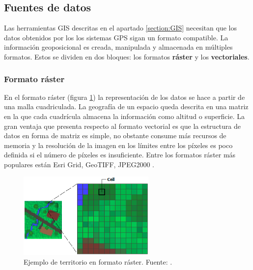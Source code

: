 \subsection{Fuentes de datos}
Las herramientas \ac{GIS} descritas en el apartado \ref{section:GIS} necesitan que los 
datos obtenidos por los los sistemas \ac{GPS} sigan un formato compatible. La 
información geoposicional es creada, manipulada y almacenada en múltiples formatos. 
Estos se dividen en dos bloques: los formatos \textbf{ráster} y los \textbf{vectoriales}. 

\subsubsection{Formato ráster}
En el formato ráster (figura \ref{figure:PointGeneration02}) la representación de los 
datos se hace a partir de una malla cuadriculada. \cite{ArgGis01} La geografía de un 
espacio queda descrita en una matriz en la que cada cuadrícula almacena la 
información como altitud o superficie. La gran ventaja que presenta respecto al formato 
vectorial es que la estructura de datos en forma de matriz es simple, no obstante 
consume más recursos de memoria y la resolución de la imagen en los límites entre los 
píxeles es poco definida si el número de píxeles es insuficiente. Entre los formatos 
ráster más populares están Esri Grid, GeoTIFF, JPEG2000 \cite{Morales01}.
\begin{figure}[!htb]
\begin{center}
\includegraphics[width=0.6\textwidth]{./Imagenes/RasterImage.png}
\caption{Ejemplo de territorio en formato ráster. Fuente: \cite{ArgGis01}.}
\label{figure:PointGeneration02}
\end{center}
\end{figure}
\newpage
